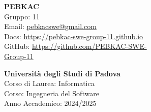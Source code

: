 \begin{minipage}[]{0.3\textwidth}
 
\end{minipage}
\hspace{0.05\textwidth}
\begin{minipage}[]{0.65\textwidth}
  {\Large \textbf{PEBKAC}} \\
  Gruppo: 11 \\
  Email: \href{mailto:pebkacswe@gmail.com}{pebkacswe@gmail.com} \\
  Docs: \href{https://pebkac-swe-group-11.github.io}{https://pebkac-swe-group-11.github.io} \\
  GitHub: \href{https://github.com/PEBKAC-SWE-Group-11}{https://github.com/PEBKAC-SWE-\\Group-11} \\
  
\end{minipage}

\bigskip

\begin{minipage}[]{0.3\textwidth}
 
\end{minipage}
\hspace{0.05\textwidth}
\begin{minipage}[]{0.65\textwidth}
  \textcolor{unipd}{
    \textbf{Università degli Studi di Padova} \\
    Corso di Laurea: Informatica \\
    Corso: Ingegneria del Software \\
    Anno Accademico: 2024/2025
  }
\end{minipage}


\bigskip
\bigskip
\bigskip